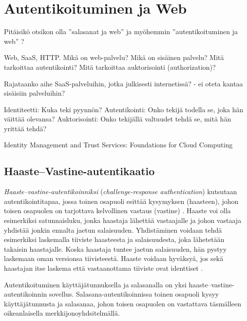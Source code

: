 \documentclass[english,gradu]{tktltiki}
\begin{document}



\section{Autentikoituminen ja Web} %
\label{sec:autentikoituminen_ja_web}

  Pitäisikö otsikon olla ''salasanat ja web'' ja myöhemmin ''autentikoituminen ja web'' ?

  Web, SaaS, HTTP.
  Mikä on web-palvelu?
  Mikä on sisäinen palvelu?
  Mitä tarkoittaa autentikointi?
  Mitä tarkoittaa auktorisointi (authorization)?

  Rajataanko aihe SaaS-palveluihin, jotka julkisesti internetissä?
  - ei oteta kantaa sisäisiin palveluihin?

  Identiteetti: Kuka teki pyynnön?
  Autentikointi: Onko tekijä todella se, joka hän väittää olevansa?
  Auktorisointi: Onko tekijällä valtuudet tehdä se, mitä hän yrittää tehdä?

  Identity Management and Trust Services: Foundations for Cloud Computing


  \subsection{Haaste--Vastine-autentikaatio} %
  \label{sub:haaste_vastine_autentikaatio}

  \emph{Haaste--vastine-autentikoinniksi} (\emph{challenge-response authentication}) kutsutaan autentikointitapaa, jossa toinen osapuoli esittää kysymyksen (haasteen), johon toisen osapuolen on tarjottava kelvollinen vastaus (vastine) \cite{NIST_SP800-63}. Haaste voi olla esimerkiksi satunnaisluku, jonka haastaja lähettää vastaajalle ja johon vastaaja yhdistää jonkin ennalta jaetun salaisuuden. Yhdistäminen voidaan tehdä esimerkiksi laskemalla tiiviste haasteesta ja salaisuudesta, joka lähetetään takaisin haastajalle. Koska haastaja tuntee jaetun salaisuuden, hän pystyy laskemaan oman versionsa tiivisteestä. Haaste voidaan hyväksyä, jos sekä haastajan itse laskema että vastaanottama tiiviste ovat identtiset \cite{NIST_SP800-63}.

  Autentikoituminen käyttäjätunnuksella ja salasanalla on yksi haaste--vastine-autentikoinnin sovellus. Salasana-autentikoinnissa toinen osapuoli kysyy käyttäjätunnusta ja salasanaa, johon toisen osapuolen on vastattava täsmälleen oikeanlaisella merkkijonoyhdsitelmällä.
\end{document}

